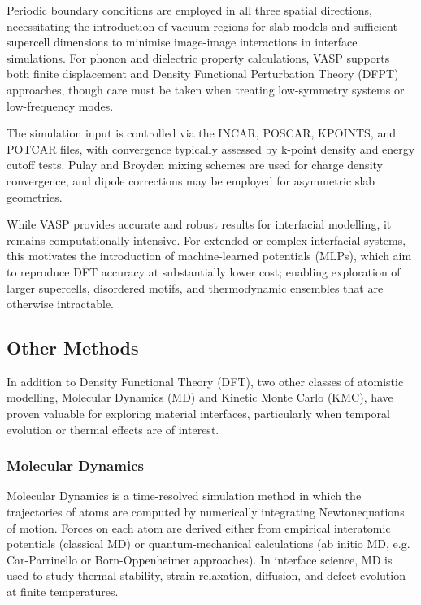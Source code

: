 Periodic boundary conditions are employed in all three spatial directions, necessitating the introduction of vacuum regions for slab models and sufficient supercell dimensions to minimise image-image interactions in interface simulations. For phonon and dielectric property calculations, VASP supports both finite displacement and Density Functional Perturbation Theory (DFPT) approaches, though care must be taken when treating low-symmetry systems or low-frequency modes.

The simulation input is controlled via the INCAR, POSCAR, KPOINTS, and POTCAR files, with convergence typically assessed by k-point density and energy cutoff tests. Pulay and Broyden mixing schemes are used for charge density convergence, and dipole corrections may be employed for asymmetric slab geometries.

While VASP provides accurate and robust results for interfacial modelling, it remains computationally intensive. For extended or complex interfacial systems, this motivates the introduction of machine-learned potentials (MLPs), which aim to reproduce DFT accuracy at substantially lower cost; enabling exploration of larger supercells, disordered motifs, and thermodynamic ensembles that are otherwise intractable.

\subsection{Other Methods}

In addition to Density Functional Theory (DFT), two other classes of atomistic modelling, Molecular Dynamics (MD) and Kinetic Monte Carlo (KMC), have proven valuable for exploring material interfaces, particularly when temporal evolution or thermal effects are of interest.

\subsubsection{Molecular Dynamics}

Molecular Dynamics is a time-resolved simulation method in which the trajectories of atoms are computed by numerically integrating Newton\rqss equations of motion. Forces on each atom are derived either from empirical interatomic potentials (classical MD) or quantum-mechanical calculations (ab initio MD, e.g. Car-Parrinello or Born-Oppenheimer approaches). In interface science, MD is used to study thermal stability, strain relaxation, diffusion, and defect evolution at finite temperatures.

